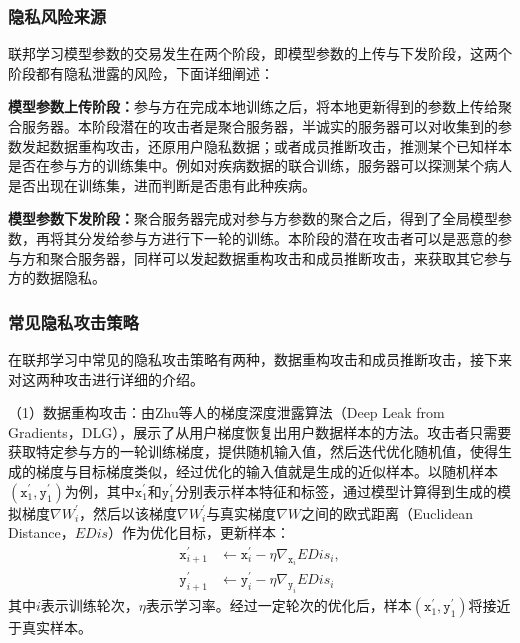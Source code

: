 \subsubsection{隐私风险来源}
联邦学习模型参数的交易发生在两个阶段，即模型参数的上传与下发阶段，这两个阶段都有隐私泄露的风险，下面详细阐述：
\begin{compactitem}
	\item \textbf{模型参数上传阶段：}参与方在完成本地训练之后，将本地更新得到的参数上传给聚合服务器。本阶段潜在的攻击者是聚合服务器，半诚实的服务器可以对收集到的参数发起数据重构攻击，还原用户隐私数据；或者成员推断攻击，推测某个已知样本是否在参与方的训练集中。例如对疾病数据的联合训练，服务器可以探测某个病人是否出现在训练集，进而判断是否患有此种疾病。
	\item \textbf{模型参数下发阶段：}聚合服务器完成对参与方参数的聚合之后，得到了全局模型参数，再将其分发给参与方进行下一轮的训练。本阶段的潜在攻击者可以是恶意的参与方和聚合服务器，同样可以发起数据重构攻击和成员推断攻击，来获取其它参与方的数据隐私。
\end{compactitem}

\subsubsection{常见隐私攻击策略}
在联邦学习中常见的隐私攻击策略有两种，数据重构攻击和成员推断攻击，接下来对这两种攻击进行详细的介绍。

（1）数据重构攻击：由Zhu等人\cite{zhu2019deep}的梯度深度泄露算法（Deep Leak from Gradients，DLG），展示了从用户梯度恢复出用户数据样本的方法。攻击者只需要获取特定参与方的一轮训练梯度，提供随机输入值，然后迭代优化随机值，使得生成的梯度与目标梯度类似，经过优化的输入值就是生成的近似样本。以随机样本$(\mathtt{x}^{\prime}_1, \mathtt{y}^{\prime}_1)$为例，其中$\mathtt{x}^{\prime}_1$和$\mathtt{y}^{\prime}_1$分别表示样本特征和标签，通过模型计算得到生成的模拟梯度$\nabla W^{\prime}_i$，然后以该梯度$\nabla W^{\prime}_i$与真实梯度$\nabla W$之间的欧式距离（Euclidean Distance，$\textit{EDis}$）作为优化目标，更新样本：
\begin{equation}
	\begin{aligned}
		\mathtt{x}_{i+1}^{\prime} &\leftarrow \mathtt{x}_i^{\prime}-\eta \nabla_{\mathtt{x}_i} \textit{EDis}_i, \\ \mathtt{y}_{i+1}^{\prime} &\leftarrow \mathtt{y}_i^{\prime}-\eta \nabla_{\mathtt{y}_i} \textit{EDis}_i
	\end{aligned}
\end{equation}
其中$i$表示训练轮次，$\eta$表示学习率。经过一定轮次的优化后，样本$(\mathtt{x}^{\prime}_1, \mathtt{y}^{\prime}_1)$将接近于真实样本。

